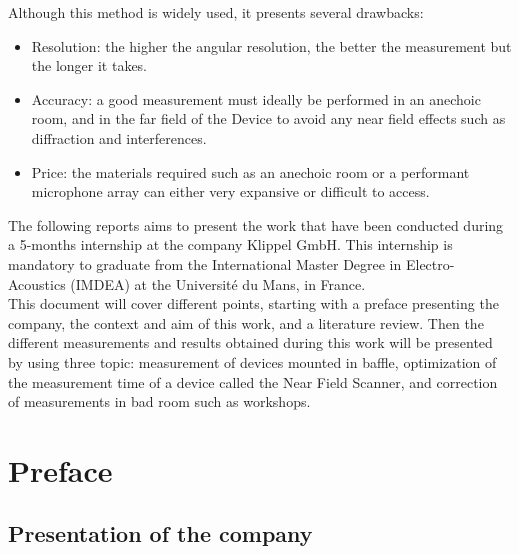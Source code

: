 \documentclass{report}
\begin{document}
Although this method is widely used, it presents several drawbacks:
\begin{itemize}
\item Resolution: the higher the angular resolution, the better the measurement but the longer it takes. 
\item Accuracy: a good measurement must ideally be performed in an anechoic room, and in the far field of the Device to avoid any near field effects such as diffraction and interferences.
\item Price: the materials required such as an anechoic room or a performant microphone array can either very expansive or difficult to access. 
\end{itemize}




The following reports aims to present the work that have been conducted during a 5-months internship at the company Klippel GmbH. This internship is mandatory to graduate from the International Master Degree in Electro-Acoustics (IMDEA) at the Université du Mans, in France. \\

This document will cover different points, starting with a preface presenting the company, the context and aim of this work, and a literature review. Then the different measurements and results obtained during this work will be presented by using three topic: measurement of devices mounted in baffle, optimization of the measurement time of a device called the Near Field Scanner, and correction of measurements in bad room such as workshops. 


\chapter{Preface}

    
\section{Presentation of the company}
\end{document}
